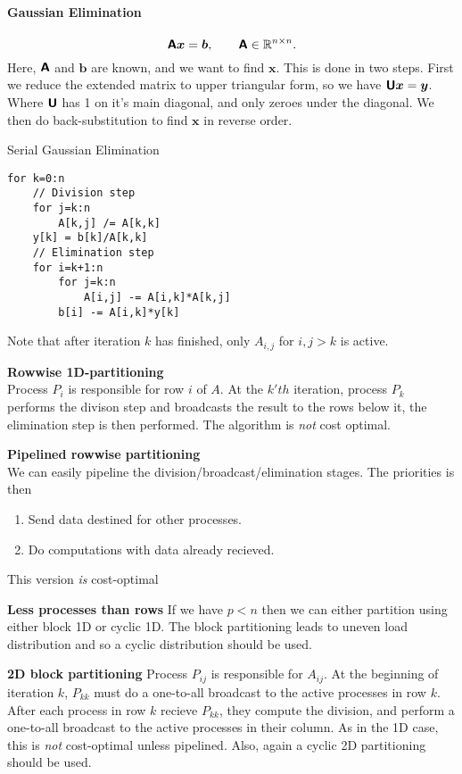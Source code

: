 \documentclass[a4paper,10pt,twoside,twocolumn]{article}
\renewcommand{\(}{\left(}
\renewcommand{\)}{\right)}
\newcommand{\bt}[1]{\boldsymbol{#1}}
\newcommand{\mat}[1]{\textsf{\textbf{#1}}}
\begin{document}
\paragraph{Gaussian Elimination}
$$\mat{A}\bt{x} = \bt{b}, \qquad \mat{A}\in\mathbb{R}^{n\times n}.$$
Here, $\mat{A}$ and $\bt{b}$ are known, and we want to find $\bt{x}$. This is done in two steps. First we reduce the extended matrix to upper triangular form,
so we have $\mat{U}\bt{x} = \bt{y}$. Where $\mat{U}$ has 1 on it's main diagonal, and only zeroes under the diagonal. We then do back-substitution to find $\bt{x}$ in reverse order.

Serial Gaussian Elimination
\begin{verbatim}
for k=0:n 
    // Division step
    for j=k:n 
        A[k,j] /= A[k,k]
    y[k] = b[k]/A[k,k]
    // Elimination step
    for i=k+1:n 
        for j=k:n 
            A[i,j] -= A[i,k]*A[k,j]
        b[i] -= A[i,k]*y[k]
\end{verbatim}
Note that after iteration $k$ has finished, only $A_{i,j}$ for $i,j>k$ is active.

\textbf{Rowwise 1D-partitioning} \\
Process $P_i$ is responsible for row $i$ of $A$. At the $k'th$ iteration, process $P_k$ performs the divison step and broadcasts the result to the rows below it, the elimination step is then performed. The algorithm is \emph{not} cost optimal.

\textbf{Pipelined rowwise partitioning} \\
We can easily pipeline the division/broadcast/elimination stages. The priorities is then
\begin{enumerate}
    \item Send data destined for other processes.
    \item Do computations with data already recieved.
\end{enumerate}
This version \emph{is} cost-optimal

\textbf{Less processes than rows}
If we have $p < n$ then we can either partition using either block 1D or cyclic 1D. The block partitioning leads to uneven load distribution and so a cyclic distribution should be used.

\textbf{2D block partitioning}
Process $P_{ij}$ is responsible for $A_{ij}$. At the beginning of iteration $k$, $P_{kk}$ must do a one-to-all broadcast to the active processes in row $k$. After each process in row $k$ recieve $P_{kk}$, they compute the division, and perform a one-to-all broadcast to the active processes in their column. As in the 1D case, this is \emph{not} cost-optimal unless pipelined. Also, again a cyclic 2D partitioning should be used.
\end{document}
